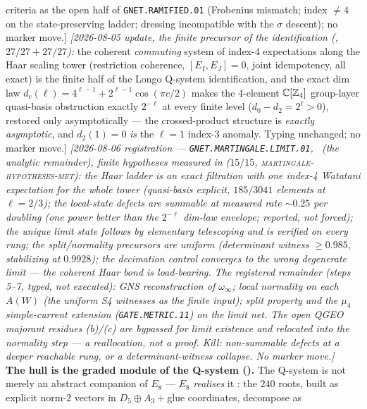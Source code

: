 criteria as the open half of \texttt{GNET.RAMIFIED.01} (Frobenius
mismatch; index $\ne4$ on the state-preserving ladder; dressing
incompatible with the $\sigma$ descent); no marker move.]
\emph{[2026-08-05 update, the finite precursor of the
identification (, $27/27+27/27$):}
the coherent \emph{commuting} system of index-4 expectations along
the Haar scaling tower (restriction coherence, $[E_I,E_J]=0$,
joint idempotency, all exact) is the finite half of the Longo
Q-system identification, and the exact dim law
$d_c(\ell)=4^{\ell-1}+2^{\ell-1}\cos(\pi c/2)$ makes the
$4$-element $\mathbb C[\mathbb Z_4]$ group-layer quasi-basis obstruction
exactly $2^{-\ell}$ at every finite level ($d_0-d_2=2^\ell>0$),
restored only asymptotically --- the crossed-product structure is
\emph{exactly asymptotic}, and $d_2(1)=0$ \emph{is} the $\ell=1$
index-3 anomaly.  Typing unchanged; no marker move.]
\emph{[2026-08-06 registration ---
\texttt{GNET.MARTINGALE.LIMIT.01}, \mO\ (the analytic remainder),
finite hypotheses measured in 
($15/15$, \textsc{martingale-hypotheses-met}): the Haar ladder is
an exact filtration with \emph{one} index-4 Watatani expectation
for the whole tower (quasi-basis explicit, $185/3041$ elements at
$\ell=2/3$); the local-state defects are summable at measured rate
${\sim}0.25$ per doubling (one power better than the $2^{-\ell}$
dim-law envelope; reported, not forced); the unique limit state
follows by elementary telescoping and is verified on every rung;
the split/normality precursors are uniform (determinant witness
$\ge0.985$, stabilizing at $0.9928$); the decimation control
converges to the \emph{wrong} degenerate limit --- the coherent
Haar bond is load-bearing.  \emph{The registered remainder (steps
5--7, typed, not executed):} GNS reconstruction of
$\omega_\infty$; local normality on each $A(W)$ (the uniform S4
witnesses as the finite input); split property and the $\mu_4$
simple-current extension (\texttt{GATE.METRIC.11}) on the limit
net.  The open QGEO majorant residues (b)/(c) are bypassed for
limit existence and relocated into the normality step --- a
reallocation, not a proof.  Kill: non-summable defects at a deeper
reachable rung, or a determinant-witness collapse.  No marker
move.]}
\smallskip\\
\noindent\textbf{The hull is the graded module of the Q-system ().} The
Q-system is not merely an abstract companion of $E_8$ --- $E_8$ \emph{realises} it \mE: the $240$
roots, built as explicit norm-$2$ vectors in $D_5\oplus A_3+$glue coordinates, decompose as
